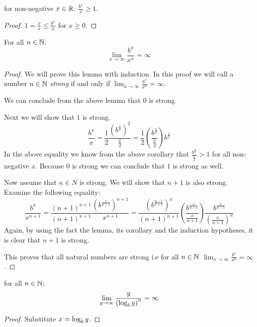 \begin{corollary}
	for non-negative $x \in \mathbb{R}$: $\frac{b^{x}}{x} \ge 1$.
\end{corollary}

\begin{proof}
	$1 = \frac{x}{x} \le \frac{b^{x}}{x}$ for $x \ge 0$.
\end{proof}

\begin{proposition}
	For all $n \in \mathbb{N}$: 
	\[
		\lim_{x \rightarrow \infty} \frac{b^{x}}{x^{n}} = \infty
	\]
\end{proposition}

\begin{proof}
	We will prove this lemma with induction. In this proof we will call a number
	$n \in \mathbb{N}$ \emph{strong} if and only if
	$\lim_{x \rightarrow \infty} \frac{b^{x}}{x^{n}} = \infty$.
	
	We can conclude from the above lemma that $0$ is strong.
	
	Next we will show that $1$ is strong.
	\[
		\frac{b^{x}}{x} =%
		\frac{1}{2}\frac{\left(b^{\frac{x}{2}}\right)^2}{\frac{x}{2}} =%
		\frac{1}{2}\left(\frac{b^{\frac{x}{2}}}{\frac{x}{2}}\right)b^{\frac{x}{2}}
	\]
	In the above equality we know from the above corollary that 
	$\frac{b^{\frac{x}{2}}}{\frac{x}{2}} > 1$ for all non-negative $x$.
	Because $0$ is strong we can conclude that $1$ is strong as well.
	
	Now assume that $n \in N$ is strong. We will show that $n+1$ is also strong.
	Examine the following equality:
	\[
		\frac{b^{x}}{x^{n+1}} =%
		\frac{(n+1)^{n+1}}{(n+1)^{n+1}}%
		\frac{\left(b^{\frac{x}{n+1}}\right)^{n+1}}{x^{n+1}} =%
		\frac{\left(b^{\frac{n-1}{n+1}}\right)^{x}}{(n+1)^{n+1}}%
		\left(\frac{b^{\frac{x}{n+1}}}{\frac{x}{n+1}}\right)%
		\frac{b^{\frac{x}{n+1}}}{\left(\frac{x}{n+1}\right)^{n}}%
	\]
	Again, by using the fact the lemma, its corollary and the induction
  hypotheses, it is clear that $n+1$ is strong.
	
	This proves that all natural numbers are strong i.e for all $n \in \mathbb{N}$
	$\lim_{x \rightarrow \infty} \frac{b^{x}}{x^{n}} = \infty$.
\end{proof}

\begin{corollary}
	for all $n \in \mathbb{N}$:
	\[
		\lim_{y \rightarrow \infty} \frac{{y}}{\left(\log_{b}{y}\right)^{n}} = \infty
	\]
\end{corollary}

\begin{proof}
	Substitute $x = \log_{b}{y}$.
\end{proof}


